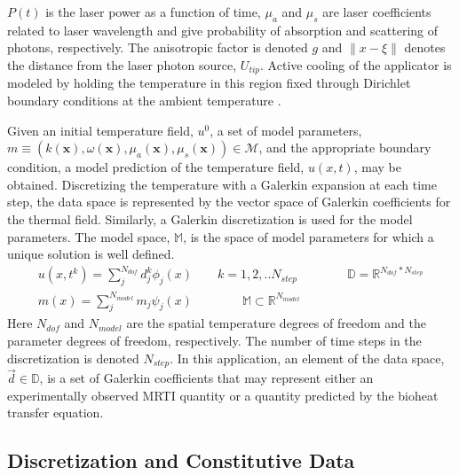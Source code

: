 \documentclass{article}
\begin{document}
$P(t) $ is the
laser power as a function of time, $\mu_a$ and $\mu_s $ are laser
coefficients related to laser wavelength and give probability of
absorption and scattering of photons, respectively. The anisotropic
factor is denoted $g$  
and $\|x-\xi\|$ denotes the distance from the laser photon source, $U_{tip}$.
Active cooling of the applicator is modeled by holding the temperature
in this region fixed through Dirichlet boundary conditions at the ambient temperature
\cite{fuentesetal11a}.

Given an initial temperature field, $u^0$, a set of model parameters,
$
m \equiv ( k(\textbf{x}), \omega(\textbf{x}), 
           \mu_a(\textbf{x}),\mu_s(\textbf{x})) \in \mathcal{M}
$, and the appropriate boundary condition, a model prediction of
the temperature field, $u(x,t)$, may be obtained.
Discretizing the temperature with a Galerkin expansion at each 
time step, the data space is represented by
the vector space of Galerkin
coefficients for the thermal field.
Similarly, a Galerkin discretization is  used for the model
parameters. The model space, $\mathbb{M}$, is the space of model
parameters for which a unique solution is well defined.
\[
\begin{split}
u(x,t^k) = \sum_j^{N_{dof}}  d_j^k  \phi_j(x) 
\qquad 
k = 1, 2, ..  N_{step}
\qquad
\qquad
\mathbb{D} = \mathbb{R}^{N_{dof}*N_{step}}
\\
m(x) = \sum_j^{N_{model}}  m_j  \psi_j(x) 
\qquad
\qquad
\mathbb{M} \subset \mathbb{R}^{N_{model}}
\end{split}
\]
Here $N_{dof}$ and $N_{model}$ are the spatial temperature degrees of freedom and the parameter
degrees of freedom, respectively. The number of time steps in the discretization is denoted $N_{step}$.
In this application, an element of the data space, $\vec{d} \in
\mathbb{D}$, is a set of Galerkin coefficients that may represent
either an experimentally observed MRTI quantity or a quantity
predicted by the bioheat transfer equation.  

\subsection{Discretization and Constitutive Data}~\label{DiscretizationConstitutive}
\end{document}
